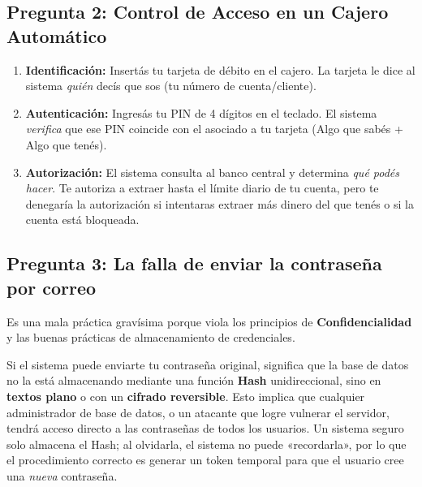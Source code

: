 \documentclass[11pt,a4paper]{article}
\begin{document}
\subsection*{Pregunta 2: Control de Acceso en un Cajero Automático}
\begin{respuesta}
\begin{enumerate}[leftmargin=*]
  \item \textbf{Identificación:} Insertás tu tarjeta de débito en el cajero. La tarjeta le dice al sistema \textit{quién} decís que sos (tu número de cuenta/cliente).
  \item \textbf{Autenticación:} Ingresás tu PIN de 4 dígitos en el teclado. El sistema \textit{verifica} que ese PIN coincide con el asociado a tu tarjeta (Algo que sabés + Algo que tenés).
  \item \textbf{Autorización:} El sistema consulta al banco central y determina \textit{qué podés hacer}. Te autoriza a extraer hasta el límite diario de tu cuenta, pero te denegaría la autorización si intentaras extraer más dinero del que tenés o si la cuenta está bloqueada.
\end{enumerate}
\end{respuesta}

\subsection*{Pregunta 3: La falla de enviar la contraseña por correo}
\begin{respuesta}
Es una mala práctica gravísima porque viola los principios de \textbf{Confidencialidad} y las buenas prácticas de almacenamiento de credenciales. 

Si el sistema puede enviarte tu contraseña original, significa que la base de datos no la está almacenando mediante una función \textbf{Hash} unidireccional, sino en \textbf{textos plano} o con un \textbf{cifrado reversible}. Esto implica que cualquier administrador de base de datos, o un atacante que logre vulnerar el servidor, tendrá acceso directo a las contraseñas de todos los usuarios. Un sistema seguro solo almacena el Hash; al olvidarla, el sistema no puede «recordarla», por lo que el procedimiento correcto es generar un token temporal para que el usuario cree una \textit{nueva} contraseña.
\end{respuesta}
\end{document}
